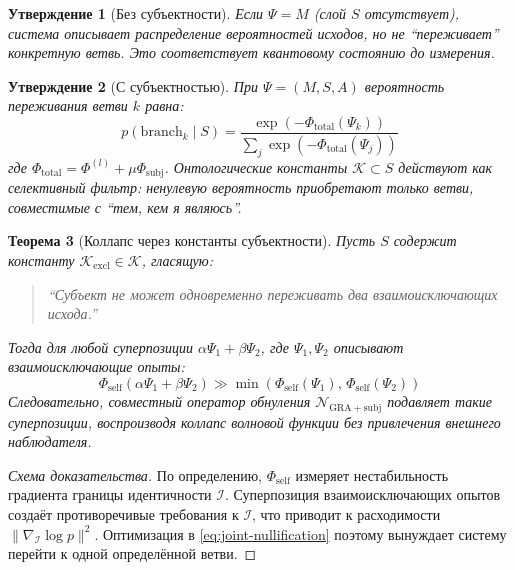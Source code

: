\documentclass[11pt,a4paper]{article}
\theoremstyle{plain}
\newtheorem{theorem}{Теорема}[section]
\newtheorem{proposition}[theorem]{Утверждение}
\theoremstyle{definition}
\theoremstyle{remark}
\newcommand{\PsiState}{\Psi}
\newcommand{\Foam}{\Phi}
\newcommand{\NullOp}{\mathcal{N}}
\newcommand{\Mmodel}{M}
\newcommand{\Ssubj}{S}
\newcommand{\Aactive}{A}
\newcommand{\Fself}{\Foam_{\mathrm{self}}}
\newcommand{\Fcog}{\Foam^{(l)}}
\newcommand{\Identity}{\mathcal{I}}
\newcommand{\Constants}{\mathcal{K}}
\begin{document}
\begin{proposition}[Без субъектности]
Если $\PsiState = \Mmodel$ (слой $\Ssubj$ отсутствует), система описывает распределение вероятностей исходов, но не ``переживает'' конкретную ветвь. Это соответствует квантовому состоянию до измерения.
\end{proposition}

\begin{proposition}[С субъектностью]
При $\PsiState = (\Mmodel, \Ssubj, \Aactive)$ вероятность переживания ветви $k$ равна:
\begin{equation}
    \boxed{
    p(\mathrm{branch}_k \mid \Ssubj) = \frac{\exp\!\left(-\Foam_{\mathrm{total}}(\PsiState_k)\right)}
    {\sum_j \exp\!\left(-\Foam_{\mathrm{total}}(\PsiState_j)\right)}
    }
    \label{eq:branch-probability}
\end{equation}
где $\Foam_{\mathrm{total}} = \Fcog + \mu \Foam_{\mathrm{subj}}$. Онтологические константы $\Constants \subset \Ssubj$ действуют как селективный фильтр: ненулевую вероятность приобретают только ветви, совместимые с ``тем, кем я являюсь''.
\end{proposition}

\begin{theorem}[Коллапс через константы субъектности]
\label{thm:collapse}
Пусть $\Ssubj$ содержит константу $\Constants_{\mathrm{excl}} \in \Constants$, гласящую:
\begin{quote}
    \textit{``Субъект не может одновременно переживать два взаимоисключающих исхода.''}
\end{quote}
Тогда для любой суперпозиции $\alpha \PsiState_1 + \beta \PsiState_2$, где $\PsiState_1, \PsiState_2$ описывают взаимоисключающие опыты:
\begin{equation}
    \Fself\!\left( \alpha \PsiState_1 + \beta \PsiState_2 \right) 
    \gg \min\!\left( \Fself(\PsiState_1),\, \Fself(\PsiState_2) \right)
\end{equation}
Следовательно, совместный оператор обнуления $\NullOp_{\mathrm{GRA+subj}}$ подавляет такие суперпозиции, воспроизводя коллапс волновой функции без привлечения внешнего наблюдателя.
\end{theorem}

\begin{proof}[Схема доказательства]
По определению, $\Fself$ измеряет нестабильность градиента границы идентичности $\Identity$. Суперпозиция взаимоисключающих опытов создаёт противоречивые требования к $\Identity$, что приводит к расходимости $\|\nabla_{\Identity} \log p\|^2$. Оптимизация в \cref{eq:joint-nullification} поэтому вынуждает систему перейти к одной определённой ветви.
\end{proof}
\end{document}
